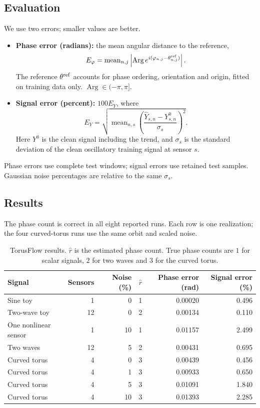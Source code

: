 \documentclass[11pt,a4paper]{article}
\begin{document}
\subsection*{Evaluation}
We use two errors; smaller values are better.
\begin{itemize}
\item \textbf{Phase error (radians):} the mean angular distance to the reference,
\[
E_\varphi=\operatorname{mean}_{n,j}
\left|\operatorname{Arg}e^{i(\varphi_{n,j}-\theta^{\rm ref}_{n,j})}\right|.
\]
The reference $\theta^{\rm ref}$ accounts for phase ordering, orientation
and origin, fitted on training data only. $\operatorname{Arg}\in(-\pi,\pi]$.
\item \textbf{Signal error (percent):} $100E_Y$, where
\[
E_Y=\sqrt{\operatorname{mean}_{n,s}
\left(\frac{\widehat Y_{s,n}-Y^0_{s,n}}{\sigma_s}\right)^2}.
\]
Here $Y^0$ is the clean signal including the trend, and $\sigma_s$ is the
standard deviation of the clean oscillatory training signal at sensor $s$.
\end{itemize}
Phase errors use complete test windows; signal errors use retained test
samples. Gaussian noise percentages are relative to the same $\sigma_s$.

\subsection*{Results}
The phase count is correct in all eight reported runs. Each row is one
realization; the four curved-torus runs use the same orbit and scaled noise.

\begin{table}[H]
\centering\small
\setlength{\tabcolsep}{6pt}
\begin{tabular}{lrrrrr}
\toprule
Signal & Sensors & Noise (\%) & $\widehat r$ & Phase error (rad) & Signal error (\%) \\
\midrule
Sine toy & 1 & 0 & 1 & 0.00020 & 0.496 \\
Two-wave toy & 12 & 0 & 2 & 0.00134 & 0.110 \\
One nonlinear sensor & 1 & 10 & 1 & 0.01157 & 2.499 \\
Two waves & 12 & 5 & 2 & 0.00431 & 0.695 \\
Curved torus & 4 & 0 & 3 & 0.00439 & 0.456 \\
Curved torus & 4 & 1 & 3 & 0.00933 & 0.650 \\
Curved torus & 4 & 5 & 3 & 0.01091 & 1.840 \\
Curved torus & 4 & 10 & 3 & 0.01393 & 2.285 \\
\bottomrule
\end{tabular}
\caption{TorusFlow results. $\widehat r$ is the estimated phase count.
True phase counts are $1$ for scalar signals, $2$ for two waves and $3$
for the curved torus.}
\label{tab:experiment-results}
\end{table}
\end{document}
